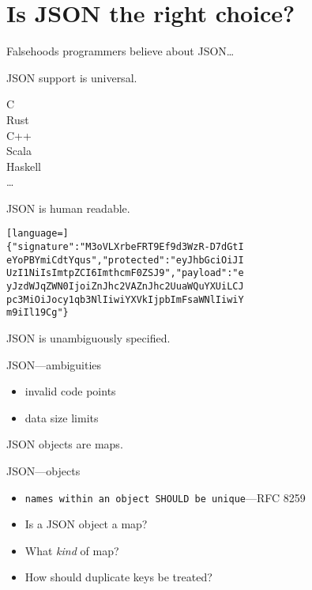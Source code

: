 \documentclass[ignorenonframetext,aspectratio=43]{beamer}
\providecommand{\tightlist}{%
  \setlength{\itemsep}{0pt}\setlength{\parskip}{0pt}}
\begin{document}
\section{Is JSON the right choice?}

\begin{frame}[plain]
\huge
Falsehoods programmers believe about JSON\ldots
\end{frame}

\begin{frame}[plain]
\huge
JSON support is universal.
\end{frame}

\begin{frame}[plain]
\LARGE \centering
C \\
Rust \\
C++ \\
Scala \\
Haskell \\
\ldots
\end{frame}

\begin{frame}[plain]
\huge
JSON is human readable.
\end{frame}

\begin{frame}[fragile]
\begin{lstlisting}[language=]
{"signature":"M3oVLXrbeFRT9Ef9d3WzR-D7dGtI
eYoPBYmiCdtYqus","protected":"eyJhbGciOiJI
UzI1NiIsImtpZCI6ImthcmF0ZSJ9","payload":"e
yJzdWJqZWN0IjoiZnJhc2VAZnJhc2UuaWQuYXUiLCJ
pc3MiOiJocy1qb3NlIiwiYXVkIjpbImFsaWNlIiwiY
m9iIl19Cg"}
\end{lstlisting}
\end{frame}

\begin{frame}[plain]
\huge
JSON is unambiguously specified.
\end{frame}

\begin{frame}{JSON---ambiguities}
\begin{itemize}
\tightlist
\item invalid code points
\item data size limits
\end{itemize}
\end{frame}

\begin{frame}[plain]
\huge
JSON objects are maps.
\end{frame}

\begin{frame}{JSON---objects}
\begin{itemize}
\tightlist
\item \texttt{names within an object SHOULD be unique}---RFC 8259
\item Is a JSON object a map?
\item What {\em kind} of map?
\item How should duplicate keys be treated?
\end{itemize}
\end{frame}
\end{document}
